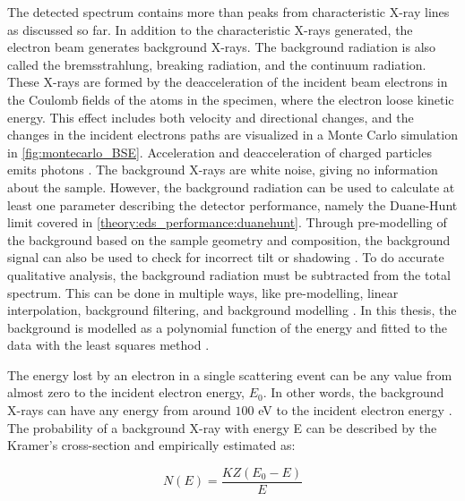 The detected spectrum contains more than peaks from characteristic X-ray lines as discussed so far.
In addition to the characteristic X-rays generated, the electron beam generates background X-rays.
The background radiation is also called the bremsstrahlung, breaking radiation, and the continuum radiation.
These X-rays are formed by the deacceleration of the incident beam electrons in the Coulomb fields of the atoms in the specimen, where the electron loose kinetic energy.
This effect includes both velocity and directional changes, and the changes in the incident electrons paths are visualized in a Monte Carlo simulation in \cref{fig:montecarlo_BSE}.
Acceleration and deacceleration of charged particles emits photons \cite{notaros_electromagnetics_2010}.
The background X-rays are white noise, giving no information about the sample.
However, the background radiation can be used to calculate at least one parameter describing the detector performance, namely the Duane-Hunt limit covered in \cref{theory:eds_performance:duanehunt}.
Through pre-modelling of the background based on the sample geometry and composition, the background signal can also be used to check for incorrect tilt or shadowing \cite{edax_insight_2019}.
To do accurate qualitative analysis, the background radiation must be subtracted from the total spectrum.
This can be done in multiple ways, like pre-modelling, linear interpolation, background filtering, and background modelling \cite{liao2006practical}.
In this thesis, the background is modelled as a polynomial function of the energy and fitted to the data with the least squares method \cite{hyperspy_1.7.1}.


The energy lost by an electron in a single scattering event can be any value from almost zero to the incident electron energy, $E_0$.
In other words, the background X-rays can have any energy from around $100$ eV to the incident electron energy \cite[Ch. 4.3]{goldstein_scanning_2018}.
The probability of a background X-ray with energy E can be described by the Kramer's cross-section and empirically estimated as:

\begin{equation}
    \label{eq:theory:xray_formation:background}
    N(E) = \frac{K Z (E_0-E)}{E}
\end{equation}

